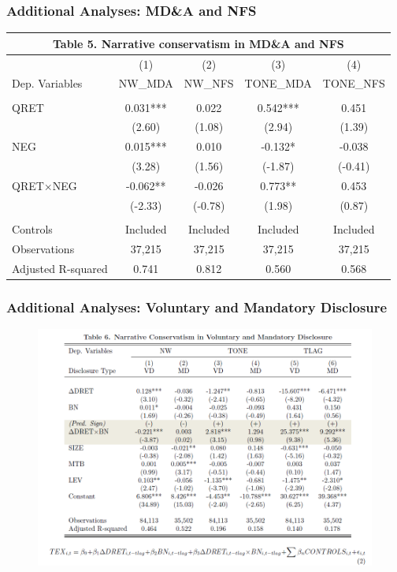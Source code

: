\documentclass{beamer}
\begin{document}
\begin{frame}
\frametitle{Additional Analyses: MD\&A and NFS}
\begin{table}[H]	\label{T5}%
	\begin{center} \scriptsize
		\begin{tabular}{lcccc}
			\multicolumn{5}{c}{\textbf{Table 5. Narrative conservatism in MD\&A and NFS}} \\
			\midrule
			\midrule
			& (1) & (2) & (3) & (4) \\
			Dep. Variables & NW\_MDA & NW\_NFS & TONE\_MDA & TONE\_NFS \\
			\midrule
			&   &   &   &  \\
			QRET & 0.031*** & 0.022 & 0.542*** & 0.451 \\
			& (2.60) & (1.08) & (2.94) & (1.39) \\
			NEG & 0.015*** & 0.010 & -0.132* & -0.038 \\
			& (3.28) & (1.56) & (-1.87) & (-0.41) \\
			QRET$\times$NEG & -0.062** & -0.026 & 0.773** & 0.453 \\
			& (-2.33) & (-0.78) & (1.98) & (0.87) \\
			&   &   &   &  \\
			Controls & Included & Included & Included & Included \\
			Observations & 37,215 & 37,215 & 37,215 & 37,215 \\
			Adjusted R-squared & 0.741 & 0.812 & 0.560 & 0.568 \\
			\bottomrule
			\bottomrule
		\end{tabular}%
	\end{center}
\end{table}
\end{frame}
\begin{frame}
\frametitle{Additional Analyses: Voluntary and Mandatory Disclosure}
	\begin{figure}[h]
	\centering
	\includegraphics[width=0.9\linewidth]{tab6}
	\label{tab6}
	\end{figure}
	
\end{frame}
\end{document}
